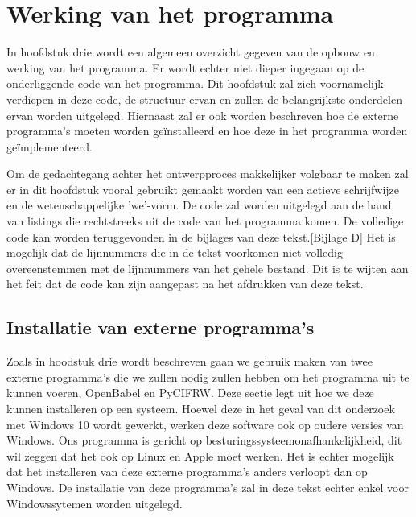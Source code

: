 

\chapter{Werking van het programma}

In hoofdstuk drie wordt een algemeen overzicht gegeven van de opbouw en werking van het programma. Er wordt echter niet dieper ingegaan op de onderliggende code van het programma. Dit hoofdstuk zal zich voornamelijk verdiepen in deze code, de structuur ervan en zullen de belangrijkste onderdelen ervan worden uitgelegd. Hiernaast zal er ook worden beschreven hoe de externe programma's moeten worden geïnstalleerd en hoe deze in het programma worden geïmplementeerd. 
\par
Om de gedachtegang achter het ontwerpproces makkelijker volgbaar te maken zal er in dit hoofdstuk vooral gebruikt gemaakt worden van een actieve schrijfwijze en de wetenschappelijke 'we'-vorm. De code zal worden uitgelegd aan de hand van listings die rechtstreeks uit de code van het programma komen. De volledige code kan worden teruggevonden in de bijlages van deze tekst.[Bijlage D] Het is mogelijk dat de lijnnummers die in de tekst voorkomen niet volledig overeenstemmen met de lijnnummers van het gehele bestand. Dit is te wijten aan het feit dat de code kan zijn aangepast na het afdrukken van deze tekst.
\par


\section{Installatie van externe programma's}
Zoals in hoodstuk drie wordt beschreven gaan we gebruik maken van twee externe programma's die we zullen nodig zullen hebben om het programma uit te kunnen voeren, OpenBabel en PyCIFRW. Deze sectie legt uit hoe we deze kunnen installeren op een systeem. Hoewel deze in het geval van dit onderzoek met Windows 10 wordt gewerkt, werken deze software ook op oudere versies van Windows. Ons programma is gericht op besturingssysteemonafhankelijkheid, dit wil zeggen dat het ook op Linux en Apple moet werken. Het is echter mogelijk dat het installeren van deze externe programma's anders verloopt dan op Windows. De installatie van deze programma's zal in deze tekst echter enkel voor Windowssytemen worden uitgelegd.


